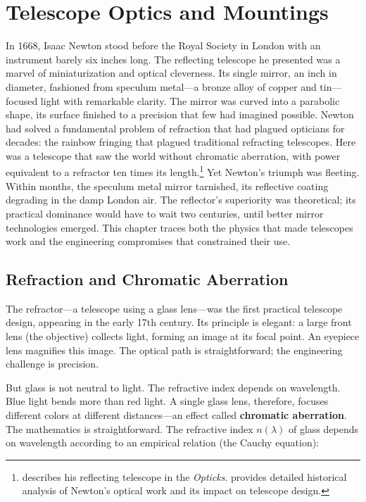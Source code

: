 \chapter{Telescope Optics and Mountings}
\label{ch:telescope-optics-mountings}

In 1668, Isaac Newton stood before the Royal Society in London with an instrument barely six inches long. The reflecting telescope he presented was a marvel of miniaturization and optical cleverness. Its single mirror, an inch in diameter, fashioned from speculum metal—a bronze alloy of copper and tin—focused light with remarkable clarity. The mirror was curved into a parabolic shape, its surface finished to a precision that few had imagined possible. Newton had solved a fundamental problem of refraction that had plagued opticians for decades: the rainbow fringing that plagued traditional refracting telescopes. Here was a telescope that saw the world without chromatic aberration, with power equivalent to a refractor ten times its length.\footnote{\textcite{Newton1704} describes his reflecting telescope in the \textit{Opticks}. \textcite{Chapman1990} provides detailed historical analysis of Newton's optical work and its impact on telescope design.} Yet Newton's triumph was fleeting. Within months, the speculum metal mirror tarnished, its reflective coating degrading in the damp London air. The reflector's superiority was theoretical; its practical dominance would have to wait two centuries, until better mirror technologies emerged. This chapter traces both the physics that made telescopes work and the engineering compromises that constrained their use.

\section{Refraction and Chromatic Aberration}

The refractor—a telescope using a glass lens—was the first practical telescope design, appearing in the early 17th century. Its principle is elegant: a large front lens (the objective) collects light, forming an image at its focal point. An eyepiece lens magnifies this image. The optical path is straightforward; the engineering challenge is precision.

But glass is not neutral to light. The refractive index depends on wavelength. Blue light bends more than red light. A single glass lens, therefore, focuses different colors at different distances—an effect called \textbf{chromatic aberration}. The mathematics is straightforward. The refractive index $n(\lambda)$ of glass depends on wavelength according to an empirical relation (the Cauchy equation):

